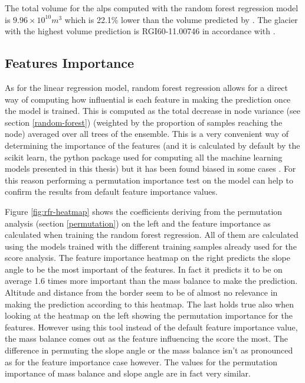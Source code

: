 The total volume for the alps computed with the random forest regression model is $9.96 \times 10^{10}m^3$ which is 22.1\% lower than the volume predicted by \citet{Farinotti2019}. The glacier with the highest volume prediction is RGI60-11.00746 in accordance with \citet{Farinotti2019}.

\subsection{Features Importance}\label{rfr-features}

As for the linear regression model, random forest regression allows for a direct way of computing how influential is each feature in making the prediction once the model is trained. This is computed as the total decrease in node variance (see section \ref{random-forest}) (weighted by the proportion of samples reaching the node) averaged over all trees of the ensemble. This is a very convenient way of determining the importance of the features (and it is calculated by default by the scikit learn, the python package used for computing all the machine learning models presented in this thesis) but it has been found biased in some cases \cite{RandomFBias2007}. For this reason performing a permutation importance test on the model can help to confirm the results from default feature importance values. 

Figure \ref{fig:rfr-heatmap} shows the coefficients deriving from the permutation analysis (section \ref{permutation}) on the left and the feature importance as calculated when training the random forest regression. All of them are calculated using the models trained with the different training samples already used for the score analysis. The feature importance heatmap on the right predicts the slope angle to be the most important of the features. In fact it predicts it to be on average 1.6 times more important than the mass balance to make the prediction. Altitude and distance from the border seem to be of almost no relevance in making the prediction according to this heatmap. The last holds true also when looking at the heatmap on the left showing the permutation importance for the features. However using this tool instead of the default feature importance value, the mass balance comes out as the feature influencing the score the most. The difference in permuting the slope angle or the mass balance isn't as pronounced as for the feature importance case however. The values for the permutation importance of mass balance and slope angle are in fact very similar.

